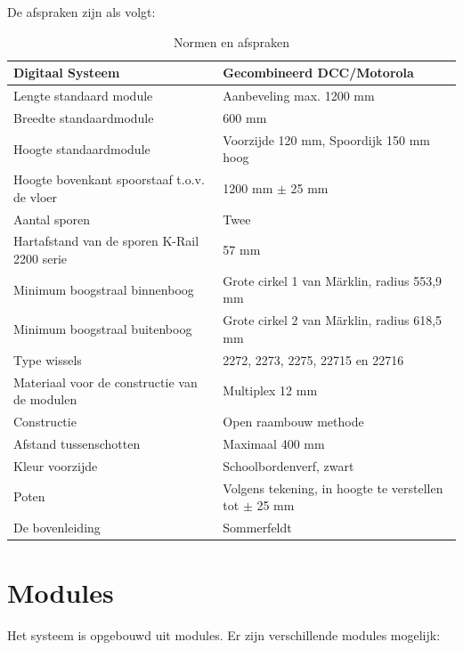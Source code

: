 \documentclass[12pt,a4paper]{report}
\newcommand*{\marklin}{M\"{a}rklin}
\begin{document}
De afspraken zijn als volgt:

\begin{table}[!ht]
\begin{tabular}{| l |p{7cm}|}
\hline
\cellcolor[gray]{0.84}Digitaal Systeem & Gecombineerd DCC/Motorola\\
\hline
\cellcolor[gray]{0.84}Lengte standaard module & Aanbeveling max. 1200 mm\\
\hline
\cellcolor[gray]{0.84}Breedte standaardmodule & 600 mm\\
\hline
\cellcolor[gray]{0.84}Hoogte standaardmodule & Voorzijde 120 mm, Spoordijk 150 mm hoog\\
\hline
\cellcolor[gray]{0.84}Hoogte bovenkant spoorstaaf t.o.v. de vloer&1200 mm $\pm$ 25 mm\\
\hline
\cellcolor[gray]{0.84}Aantal sporen&Twee\\
\hline
\cellcolor[gray]{0.84}Hartafstand van de sporen K-Rail 2200 serie&57 mm\\
\hline
\cellcolor[gray]{0.84}Minimum boogstraal binnenboog&Grote cirkel 1 van \marklin, radius 553,9 mm\\
\hline
\cellcolor[gray]{0.84}Minimum boogstraal buitenboog&Grote cirkel 2 van \marklin, radius 618,5 mm\\
\hline
\cellcolor[gray]{0.84}Type wissels&2272, 2273, 2275, 22715 en 22716\\
\hline
\cellcolor[gray]{0.84}Materiaal voor de constructie van de modulen&Multiplex 12 mm\\
\hline
\cellcolor[gray]{0.84}Constructie&Open raambouw methode\\
\hline
\cellcolor[gray]{0.84}Afstand tussenschotten&Maximaal 400 mm\\
\hline
\cellcolor[gray]{0.84}Kleur voorzijde&Schoolbordenverf, zwart\\
\hline
\cellcolor[gray]{0.84}Poten&Volgens tekening, in hoogte te verstellen tot $\pm$ 25 mm\\
\hline
\cellcolor[gray]{0.84}De bovenleiding&Sommerfeldt\\
\hline
\end{tabular}
\caption{Normen en afspraken}
\end{table}

\chapter{Modules}
\label{ch:modules}
Het systeem is opgebouwd uit modules. Er zijn verschillende modules mogelijk:
\end{document}
